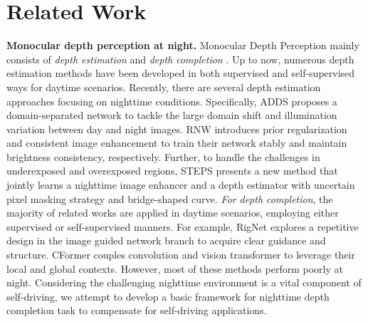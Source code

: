 \documentclass{article}
\begin{document}
\section{Related Work}
\textbf{Monocular depth perception at night.} 
Monocular Depth Perception mainly consists of \emph{depth estimation} \cite{zhou2017unsupervised} and \emph{depth completion} \cite{Uhrig2017THREEDV}. Up to now, numerous  depth estimation methods have been developed in both supervised \cite{zhang2019pattern,li2022binsformer,yuan2022new,agarwal2023attention,liu2023va,piccinelli2023idisc} and self-supervised \cite{zhou2017unsupervised,chawla2021multimodal,shu2020featdepth,guizilini20203d,long2020occlusion,yan2021channel} ways for daytime scenarios. Recently, there are several depth estimation approaches \cite{wang2021regularizing,liu2021self,zheng2023steps} focusing on nighttime conditions. Specifically, ADDS \cite{liu2021self} proposes a domain-separated network to tackle the large domain shift and illumination variation between day and night images. RNW \cite{wang2021regularizing} introduces prior regularization and consistent image enhancement to train their network stably and maintain brightness consistency, respectively. Further, to handle the challenges in underexposed and overexposed regions, STEPS \cite{zheng2023steps} presents a new method that jointly learns a nighttime image enhancer and a depth estimator with uncertain pixel masking strategy and bridge-shaped curve. \emph{For depth completion}, the majority of related works are applied in daytime scenarios, employing either supervised \cite{tang2020learning,park2020nonlocal,yan2022rignet,lin2022dynamic,liu2023mff,Zhang2023CompletionFormer} or self-supervised \cite{wong2020unsupervised,wong2021learning,wong2021adaptive,wong2021unsupervised,yan2022desnet} manners. For example, RigNet \cite{yan2022rignet} explores a repetitive design in the image guided network branch to acquire clear guidance and structure. CFormer \cite{Zhang2023CompletionFormer} couples convolution and vision transformer to leverage their local and global contexts. However, most of these methods perform poorly at night. %
Considering the challenging nighttime environment is a vital component of self-driving, we attempt to develop a basic framework for nighttime depth completion task to compensate for self-driving applications. 
\end{document}
